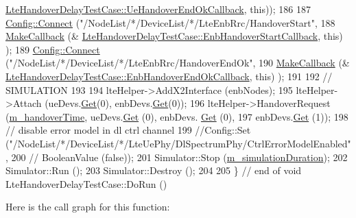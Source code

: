 \begin{DoxyCode}
      \hyperlink{classLteHandoverDelayTestCase_a48877098b2c388ff961a4c31171b2583}{LteHandoverDelayTestCase::UeHandoverEndOkCallback}, \textcolor{keyword}{this}));
186 
187   \hyperlink{group__config_ga4014f151241cd0939b6cb64409605736}{Config::Connect} (\textcolor{stringliteral}{"/NodeList/*/DeviceList/*/LteEnbRrc/HandoverStart"},
188       \hyperlink{group__makecallbackmemptr_ga9376283685aa99d204048d6a4b7610a4}{MakeCallback} (&
      \hyperlink{classLteHandoverDelayTestCase_a01717887b6978920983a3c3264bbd5ba}{LteHandoverDelayTestCase::EnbHandoverStartCallback}, \textcolor{keyword}{this})
      );
189   \hyperlink{group__config_ga4014f151241cd0939b6cb64409605736}{Config::Connect} (\textcolor{stringliteral}{"/NodeList/*/DeviceList/*/LteEnbRrc/HandoverEndOk"},
190       \hyperlink{group__makecallbackmemptr_ga9376283685aa99d204048d6a4b7610a4}{MakeCallback} (&
      \hyperlink{classLteHandoverDelayTestCase_a8d120f217e0a9a426eb44f3923d24290}{LteHandoverDelayTestCase::EnbHandoverEndOkCallback}, \textcolor{keyword}{this})
      );
191 
192   \textcolor{comment}{// SIMULATION}
193 
194   lteHelper->AddX2Interface (enbNodes);
195   lteHelper->Attach (ueDevs.\hyperlink{classns3_1_1NetDeviceContainer_a677d62594b5c9d2dea155cc5045f4d0b}{Get}(0), enbDevs.\hyperlink{classns3_1_1NetDeviceContainer_a677d62594b5c9d2dea155cc5045f4d0b}{Get}(0));
196   lteHelper->HandoverRequest (\hyperlink{classLteHandoverDelayTestCase_a5dd216089c9a2cc3f0a65430b40233e9}{m\_handoverTime}, ueDevs.\hyperlink{classns3_1_1NetDeviceContainer_a677d62594b5c9d2dea155cc5045f4d0b}{Get} (0), enbDevs.
      \hyperlink{classns3_1_1NetDeviceContainer_a677d62594b5c9d2dea155cc5045f4d0b}{Get} (0),
197       enbDevs.\hyperlink{classns3_1_1NetDeviceContainer_a677d62594b5c9d2dea155cc5045f4d0b}{Get} (1));
198   \textcolor{comment}{// disable error model in dl ctrl channel}
199   \textcolor{comment}{//Config::Set ("/NodeList/*/DeviceList/*/LteUePhy/DlSpectrumPhy/CtrlErrorModelEnabled",}
200   \textcolor{comment}{//    BooleanValue (false));}
201   Simulator::Stop (\hyperlink{classLteHandoverDelayTestCase_a10725b3aaed8df85c81a3a64a944e78d}{m\_simulationDuration});
202   Simulator::Run ();
203   Simulator::Destroy ();
204 
205 \} \textcolor{comment}{// end of void LteHandoverDelayTestCase::DoRun ()}
\end{DoxyCode}


Here is the call graph for this function\+:


